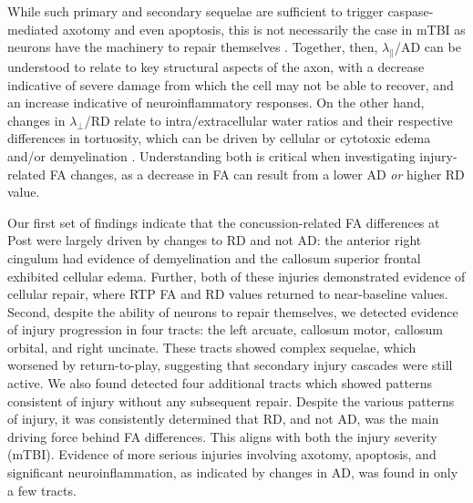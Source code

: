 \documentclass[12pt]{article}
\begin{document}
While such primary and secondary sequelae are sufficient to trigger caspase-mediated axotomy and even apoptosis, this is not necessarily the case in mTBI as neurons have the machinery to repair themselves \parencite{franze2013MechanicsNeuronalDevelopment,sakai2019InflammationNeuralRepair}. Together, then, $\lambda_\parallel$/AD can be understood to relate to key structural aspects of the axon, with a decrease indicative of severe damage from which the cell may not be able to recover, and an increase indicative of neuroinflammatory responses. On the other hand, changes in $\lambda_\perp$/RD relate to intra/extracellular water ratios and their respective differences in tortuosity, which can be driven by cellular or cytotoxic edema and/or demyelination \parencite{borja2018DiffusionMRImaging,mayer2017SpectrumMildTraumatic,lindsey2023DiffusionWeightedImagingMild}. Understanding both is critical when investigating injury-related FA changes, as a decrease in FA can result from a lower AD \textit{or} higher RD value.

Our first set of findings indicate that the concussion-related FA differences at Post were largely driven by changes to RD and not AD: the anterior right cingulum had evidence of demyelination and the callosum superior frontal exhibited cellular edema. Further, both of these injuries demonstrated evidence of cellular repair, where RTP FA and RD values returned to near-baseline values. Second, despite the ability of neurons to repair themselves, we detected evidence of injury progression in four tracts: the left arcuate, callosum motor, callosum orbital, and right uncinate. These tracts showed complex sequelae, which worsened by return-to-play, suggesting that secondary injury cascades were still active. We also found detected four additional tracts which showed patterns consistent of injury without any subsequent repair. Despite the various patterns of injury, it was consistently determined that RD, and not AD, was the main driving force behind FA differences. This aligns with both the injury severity (mTBI). Evidence of more serious injuries involving axotomy, apoptosis, and significant neuroinflammation, as indicated by changes in AD, was found in only a few tracts.
\end{document}
